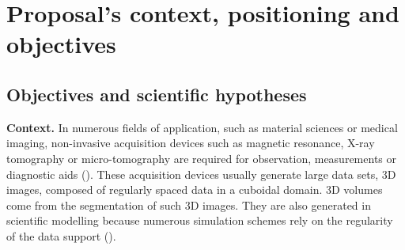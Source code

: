 \section{Proposal's context, positioning and objectives}
\label{sec:context}

\subsection{Objectives and scientific hypotheses}
\label{sec:goals}


\noindent\textbf{Context.}
In numerous fields of application, such as material sciences
or medical imaging, non-invasive acquisition devices such as magnetic
resonance, X-ray tomography or micro-tomography are required for
observation, measurements or diagnostic aids
(\eg \cite{Hildebrand1999,dcoeurjo_flin_ImPro}). %
These acquisition devices usually generate large data sets, \ie
3D images, composed of regularly spaced data in a cuboidal domain.
3D volumes come from the segmentation of such 3D images.
They are also generated in scientific modelling because
numerous simulation schemes rely on the regularity of the data support
(\eg \cite{wojtan2007animating,jones2010directable,marechal2010heat}).



